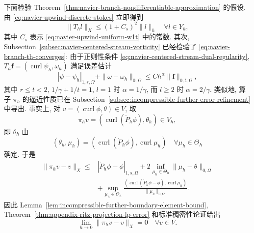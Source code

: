 下面检验 Theorem~\ref{thm:navier-branch-nondifferentiable-approximation} 的假设.
由 \eqref{eq:navier-upwind-discrete-stokes} 立即得到
\begin{equation}\label{eq:navier-upwind-th-bound}
\|T_hl\|_X\leq(1+C_s)^2\|l\|_h
\quad\forall l\in Y_h,
\end{equation}
其中 $C_s$ 表示 \eqref{eq:navier-upwind-uniform-w1t} 中的常数. 其次,
Subsection~\ref{subsec:navier-centered-stream-vorticity} 已经检验了
\eqref{eq:navier-branch-th-converges}: 由于正则性条件
\eqref{eq:navier-centered-stream-dual-regularity},
$T_h\boldsymbol f=(\operatorname{curl}\psi_h,\omega_h)$ 满足误差估计
\begin{equation}\label{eq:navier-upwind-stokes-error}
|\psi-\psi_h|_{1,s,\Omega}+\|\omega-\omega_h\|_{0,\Omega}
\leq Ch^\alpha\|\boldsymbol f\|_{0,t,\Omega},
\end{equation}
其中 $r\leq t<2$, $1/\gamma+1/t=1$,
$l=1$ 时 $\alpha=1/\gamma$, 而 $l\geq2$ 时 $\alpha=2/\gamma$.
类似地, 算子 $\pi_h$ 的逼近性质已在
Subsection~\ref{subsec:incompressible-further-error-refinement} 中导出.
事实上, 对 $v=(\operatorname{curl}\phi,\theta)\in V$, 取
\begin{equation}\label{eq:navier-upwind-projection-operator}
\pi_hv=(\operatorname{curl}(\mathring P_h\phi),\theta_h)\in V_h,
\end{equation}
即 $\theta_h$ 由
\[
(\theta_h,\mu_h)
=(\operatorname{curl}(\mathring P_h\phi),\operatorname{curl}\mu_h)
\quad\forall\mu_h\in\Theta_h
\]
确定. 于是
\[
\begin{aligned}
\|\pi_hv-v\|_X\leq{}&
|\mathring P_h\phi-\phi|_{1,s,\Omega}
+2\inf_{\mu_h\in\Theta_h}\|\mu_h-\theta\|_{0,\Omega}\\
&+\sup_{\mu_h\in\Theta_h}
\frac{(\operatorname{curl}(\mathring P_h\phi-\phi),
\operatorname{curl}\mu_h)}{\|\mu_h\|_{0,\Omega}}.
\end{aligned}
\]
因此 Lemma~\ref{lem:incompressible-further-boundary-element-bound},
Theorem~\ref{thm:appendix-ritz-projection-lp-error} 和标准稠密性论证给出
\[
\lim_{h\to0}\|\pi_hv-v\|_X=0
\quad\forall v\in V.
\]
